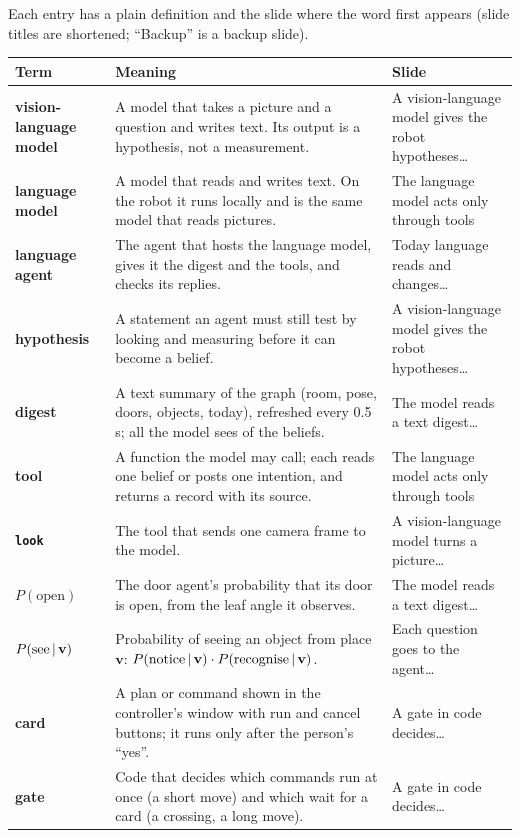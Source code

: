 \documentclass[11pt]{article}
\begin{document}
Each entry has a plain definition and the slide where the word first appears (slide titles are shortened; ``Backup'' is a backup slide).

\footnotesize
\setlength{\LTpre}{2pt}\setlength{\LTpost}{2pt}
\renewcommand{\arraystretch}{1.03}
\begin{longtable}{@{}>{\raggedright\bfseries}p{2.8cm} p{8.9cm} >{\raggedright\arraybackslash}p{4.2cm}@{}}
\toprule
Term & Meaning & Slide\\\midrule\endhead
vision-language model & A model that takes a picture and a question and writes text. Its output is a hypothesis, not a measurement. & A vision-language model gives the robot hypotheses\ldots\\
language model & A model that reads and writes text. On the robot it runs locally and is the same model that reads pictures. & The language model acts only through tools\\
language agent & The agent that hosts the language model, gives it the digest and the tools, and checks its replies. & Today language reads and changes\ldots\\
hypothesis & A statement an agent must still test by looking and measuring before it can become a belief. & A vision-language model gives the robot hypotheses\ldots\\
digest & A text summary of the graph (room, pose, doors, objects, today), refreshed every 0.5 s; all the model sees of the beliefs. & The model reads a text digest\ldots\\
tool & A function the model may call; each reads one belief or posts one intention, and returns a record with its source. & The language model acts only through tools\\
\texttt{look} & The tool that sends one camera frame to the model. & A vision-language model turns a picture\ldots\\
$P(\text{open})$ & The door agent's probability that its door is open, from the leaf angle it observes. & The model reads a text digest\ldots\\
$P(\text{see}\,|\,\mathbf v)$ & Probability of seeing an object from place $\mathbf v$: $P(\text{notice}\,|\,\mathbf v)\cdot P(\text{recognise}\,|\,\mathbf v)$. & Each question goes to the agent\ldots\\
card & A plan or command shown in the controller's window with run and cancel buttons; it runs only after the person's ``yes''. & A gate in code decides\ldots\\
gate & Code that decides which commands run at once (a short move) and which wait for a card (a crossing, a long move). & A gate in code decides\ldots\\

\end{longtable}
\end{document}
